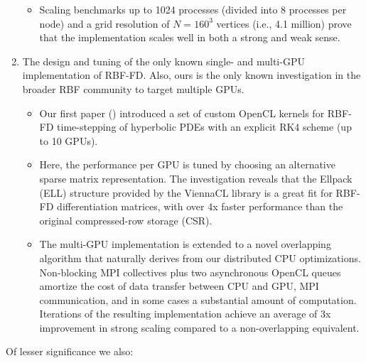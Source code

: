 \documentclass[11pt]{report}
\begin{document}
\begin{enumerate}
\begin{itemize}
\item Scaling benchmarks up to 1024 processes (divided into 8 processes per node) and a grid resolution of $N=160^3$ vertices (i.e., 4.1 million) prove that the implementation scales well in both a strong and weak sense. 
\end{itemize} 
\item The design and tuning of the only known single- and multi-GPU implementation of RBF-FD. Also, ours is the only known investigation in the broader RBF community to target multiple GPUs. 
\begin{itemize} 
\item Our first paper (\cite{BolligFlyerErlebacher2012}) introduced a set of custom OpenCL kernels for RBF-FD time-stepping of hyperbolic PDEs with an explicit RK4 scheme (up to 10 GPUs). 
\item Here, the performance per GPU is tuned by choosing an alternative sparse matrix representation. The investigation reveals that the Ellpack (ELL) structure provided by the ViennaCL library \cite{Rupp2010} is a great fit for RBF-FD differentiation matrices, with over 4x faster performance than the original compressed-row storage (CSR). %
\item The multi-GPU implementation is extended to a novel overlapping algorithm that naturally derives from our distributed CPU optimizations. Non-blocking MPI collectives plus two asynchronous OpenCL queues amortize the cost of data transfer between CPU and GPU, MPI communication, and in some cases a substantial amount of computation. Iterations of the resulting implementation achieve an average of 3x improvement in strong scaling compared to a non-overlapping equivalent. 
\end{itemize} 
\end{enumerate}
Of lesser significance we also: 
\end{document}

